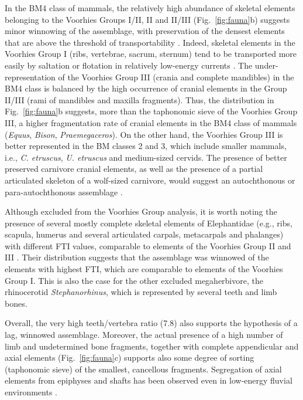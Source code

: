 \documentclass[review,times,authoryear]{elsarticle} %
\begin{document}
In the BM4 class of mammals, the relatively high abundance of skeletal elements belonging to the Voorhies Groups I/II, II and II/III (Fig.~\ref{fig:fauna}b) suggests minor winnowing of the assemblage, with preservation of the densest elements that are above the threshold of transportability \citep{Behrensmeyer1988}. Indeed, skeletal elements in the Voorhies Group I (ribs, vertebrae, sacrum, sternum) tend to be transported more easily by saltation or flotation in relatively low-energy currents \citep{Voorhies1969}. The under-representation of the Voorhies Group III (crania and complete mandibles) in the BM4 class is balanced by the high occurrence of cranial elements in the Group II/III (rami of mandibles and maxilla fragments). Thus, the distribution in Fig.~\ref{fig:fauna}b suggests, more than the taphonomic sieve of the Voorhies Group III, a higher fragmentation rate of cranial elements in the BM4 class of mammals (\emph{Equus}, \emph{Bison}, \emph{Praemegaceros}). On the other hand, the Voorhies Group III is better represented in the BM classes 2 and 3, which include smaller mammals, i.e., \emph{C. etruscus}, \emph{U. etruscus} and medium-sized cervids. The presence of better preserved carnivore cranial elements, as well as the presence of a partial articulated skeleton of a wolf-sized carnivore, would suggest an autochthonous or para-autochthonous assemblage \citep{Behrensmeyer1988}.

Although excluded from the Voorhies Group analysis, it is worth noting the presence of several mostly complete skeletal elements of Elephantidae (e.g., ribs, scapula, humerus and several articulated carpals, metacarpals and phalanges) with different FTI values, comparable to elements of the Voorhies Group II and III \citep{Frison1986}. Their distribution suggests that the assemblage was winnowed of the elements with highest FTI, which are comparable to elements of the Voorhies Group I. This is also the case for the other excluded megaherbivore, the rhinocerotid \emph{Stephanorhinus}, which is represented by several teeth and limb bones.

Overall, the very high teeth/vertebra ratio (7.8) also supports the hypothesis of a lag, winnowed assemblage. Moreover, the actual presence of a high number of limb and undetermined bone fragments, together with complete appendicular and axial elements (Fig.~\ref{fig:fauna}c) supports also some degree of sorting (taphonomic sieve) of the smallest, cancellous fragments. Segregation of axial elements from epiphyses and shafts has been observed even in low-energy fluvial environments \citep{Dominguez-Rodrigo2017}.
\end{document}
